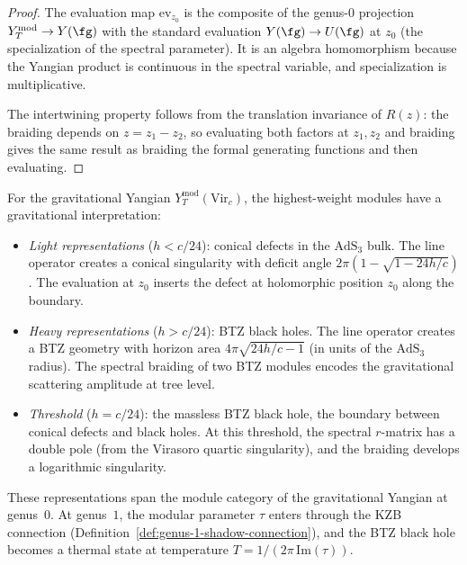 \begin{proof}
The evaluation map $\mathrm{ev}_{z_0}$ is the composite of the
genus-$0$ projection $Y_T^{\mathrm{mod}} \to Y(\fg)$ with the
standard evaluation $Y(\fg) \to U(\fg)$ at $z_0$ (the
specialization of the spectral parameter). It is an algebra
homomorphism because the Yangian product is continuous in
the spectral variable, and specialization is multiplicative.

The intertwining property follows from the translation invariance
of $R(z)$: the braiding depends on $z = z_1 - z_2$, so evaluating
both factors at $z_1, z_2$ and braiding gives the same result as
braiding the formal generating functions and then evaluating.
\end{proof}

\begin{remark}
For the gravitational Yangian
$Y_T^{\mathrm{mod}}(\mathrm{Vir}_c)$, the highest-weight modules
have a gravitational interpretation:
\begin{itemize}
\item \emph{Light representations} ($h < c/24$): conical defects
in the $\mathrm{AdS}_3$ bulk. The line operator creates a
conical singularity with deficit angle $2\pi(1 - \sqrt{1 - 24h/c})$.
The evaluation at $z_0$ inserts the defect at holomorphic position
$z_0$ along the boundary.

\item \emph{Heavy representations} ($h > c/24$): BTZ black holes.
The line operator creates a BTZ geometry with horizon area
$4\pi\sqrt{24h/c - 1}$ (in units of the $\mathrm{AdS}_3$ radius).
The spectral braiding of two BTZ modules encodes the gravitational
scattering amplitude at tree level.

\item \emph{Threshold} ($h = c/24$): the massless BTZ black hole,
the boundary between conical defects and black holes. At this
threshold, the spectral $r$-matrix has a double pole (from the
Virasoro quartic singularity), and the braiding develops a
logarithmic singularity.
\end{itemize}
These representations span the module category of the gravitational
Yangian at genus~$0$. At genus~$1$, the modular parameter $\tau$
enters through the KZB connection
(Definition~\ref{def:genus-1-shadow-connection}), and the BTZ
black hole becomes a thermal state at temperature
$T = 1/(2\pi\, \mathrm{Im}(\tau))$.
\end{remark}

